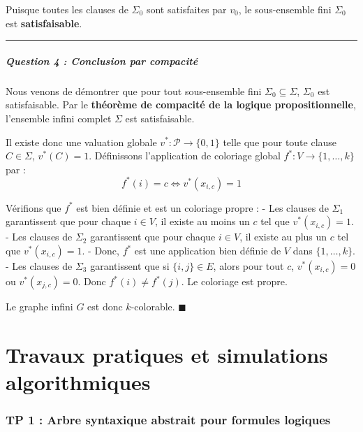 \documentclass[11pt,a4paper]{article}
\begin{document}
Puisque toutes les clauses de \(\Sigma_0\) sont satisfaites par \(v_0\),
le sous-ensemble fini \(\Sigma_0\) est \textbf{satisfaisable}.

\begin{center}\rule{0.5\linewidth}{0.5pt}\end{center}

\hypertarget{question-4-conclusion-par-compacituxe9}{%
\subsubsection{Question 4 : Conclusion par
compacité}\label{question-4-conclusion-par-compacituxe9}}

Nous venons de démontrer que pour tout sous-ensemble fini
\(\Sigma_0 \subseteq \Sigma\), \(\Sigma_0\) est satisfaisable. Par le
\textbf{théorème de compacité de la logique propositionnelle},
l'ensemble infini complet \(\Sigma\) est satisfaisable.

Il existe donc une valuation globale \(v^* : \mathcal{P} \to \{0, 1\}\)
telle que pour toute clause \(C \in \Sigma\), \(v^*(C) = 1\).
Définissons l'application de coloriage global
\(f^* : V \to \{1, \dots, k\}\) par :
\[f^*(i) = c \iff v^*(x_{i, c}) = 1\]

Vérifions que \(f^*\) est bien définie et est un coloriage propre : -
Les clauses de \(\Sigma_1\) garantissent que pour chaque \(i \in V\), il
existe au moins un \(c\) tel que \(v^*(x_{i, c}) = 1\). - Les clauses de
\(\Sigma_2\) garantissent que pour chaque \(i \in V\), il existe au plus
un \(c\) tel que \(v^*(x_{i, c}) = 1\). - Donc, \(f^*\) est une
application bien définie de \(V\) dans \(\{1, \dots, k\}\). - Les
clauses de \(\Sigma_3\) garantissent que si \(\{i, j\} \in E\), alors
pour tout \(c\), \(v^*(x_{i, c}) = 0\) ou \(v^*(x_{j, c}) = 0\). Donc
\(f^*(i) \neq f^*(j)\). Le coloriage est propre.

Le graphe infini \(G\) est donc \(k\)-colorable. \(\blacksquare\)
\n


\part{Travaux pratiques et simulations algorithmiques}
\hypertarget{tp-1-arbre-syntaxique-abstrait-pour-formules-logiques}{%
\section{TP 1 : Arbre syntaxique abstrait pour formules
logiques}\label{tp-1-arbre-syntaxique-abstrait-pour-formules-logiques}}
\end{document}

